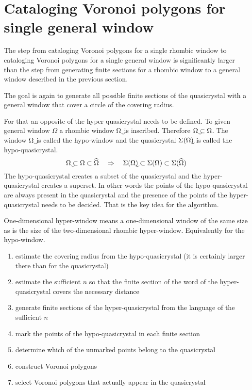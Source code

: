 \documentclass[text.tex]{subfiles}
\begin{document}
\section{Cataloging Voronoi polygons for single general window}
The step from cataloging Voronoi polygons for a single rhombic window to cataloging Voronoi polygons for a single general window is significantly larger than the step from generating finite sections for a rhombic window to a general window described in the previous section. 

The goal is again to generate all possible finite sections of the quasicrystal with a general window that cover a circle of the covering radius. 

For that an opposite of the hyper-quasicrystal needs to be defined. To given general window $\Omega$ a rhombic window $\uwidehat{\Omega}$ is inscribed. Therefore $\uwidehat{\Omega}\subset\Omega$. The window $\uwidehat{\Omega}$ is called the hypo-window and the quasicrystal $\quasi{\uwidehat{\Omega}}$ is called the hypo-quasicrystal. 
$$\uwidehat{\Omega}\subset\Omega\subset\widehat{\Omega} \quad \Rightarrow \quad \quasi{\uwidehat{\Omega}}\subset\quasi{\Omega}\subset\quasi{\widehat{\Omega}}$$
The hypo-quasicrystal creates a subset of the quasicrystal and the hyper-quasicrystal creates a superset. In other words the points of the hypo-quasicrystal are always present in the quasicrystal and the presence of the points of the hyper-quasicrystal needs to be decided. That is the key idea for the algorithm. 

\begin{remark}
One-dimensional hyper-window means a one-dimensional window of the same size as is the size of the two-dimensional rhombic hyper-window. Equivalently for the hypo-window. 
\end{remark}

\begin{enumerate}
\item estimate the covering radius from the hypo-quasicrystal (it is certainly larger there than for the quasicrystal)
\item estimate the sufficient $n$ so that the finite section of the word of the hyper-quasicrystal covers the necessary distance
\item generate finite sections of the hyper-quasicrystal from the language of the sufficient $n$
\item mark the points of the hypo-quasicrystal in each finite section
\item determine which of the unmarked points belong to the quasicrystal
\item construct Voronoi polygons
\item select Voronoi polygons that actually appear in the quasicrystal
\end{enumerate}
\end{document}
